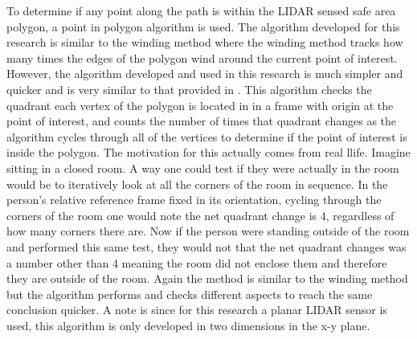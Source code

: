 \documentclass[12pt,onecolumn]{report}
\begin{document}
To determine if any point along the path is within the LIDAR sensed safe area polygon, a point in polygon algorithm is used. The algorithm developed for this research is similar to the winding method where the winding method tracks how many times the edges of the polygon wind around the current point of interest. However, the algorithm developed and used in this research is much simpler and quicker and is very similar to that provided in \cite{pointinpolygon2014}. This algorithm checks the quadrant each vertex of the polygon is located in in a frame with origin at the point of interest, and counts the number of times that quadrant changes as the algorithm cycles through all of the vertices to determine if the point of interest is inside the polygon. The motivation for this actually comes from real llife. Imagine sitting in a closed room. A way one could test if they were actually in the room would be to iteratively look at all the corners of the room in sequence. In the person's relative reference frame fixed in its orientation, cycling through the corners of the room one would note the net quadrant change is 4, regardless of how many corners there are. Now if the person were standing outside of the room and performed this same test, they would not that the net quadrant changes was a number other than 4 meaning the room did not enclose them and therefore they are outside of the room. Again the method is similar to the winding method but the algorithm performs and checks different aspects to reach the same conclusion quicker. A note is since for this research a planar LIDAR sensor is used, this algorithm is only developed in two dimensions in the x-y plane. 
\end{document}
